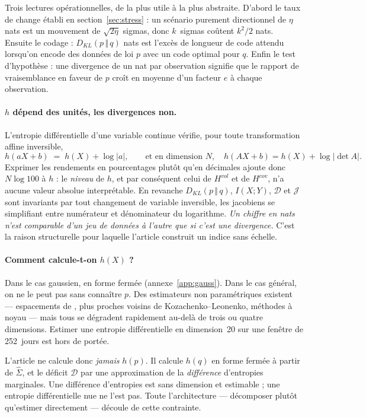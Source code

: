 \documentclass[11pt]{article}
\theoremstyle{definition}
\theoremstyle{remark}
\newcommand{\JJ}{\mathcal{J}}
\newcommand{\DD}{\mathcal{D}}
\newcommand{\KL}[2]{D_{KL}\!\left(#1\,\Vert\,#2\right)}
\begin{document}
Trois lectures opérationnelles, de la plus utile à la plus abstraite. D'abord le
taux de change établi en section~\ref{sec:stress} : un scénario purement
directionnel de $\eta$ nats est un mouvement de $\sqrt{2\eta}$ sigmas, donc
$k$~sigmas coûtent $k^2/2$ nats. Ensuite le codage : $\KL{p}{q}$ nats est
l'excès de longueur de code attendu lorsqu'on encode des données de loi $p$ avec
un code optimal pour $q$. Enfin le test d'hypothèse : une divergence de un nat
par observation signifie que le rapport de vraisemblance en faveur de $p$ croît
en moyenne d'un facteur $e$ à chaque observation.

\paragraph{$h$ dépend des unités, les divergences non.} L'entropie différentielle
d'une variable continue vérifie, pour toute transformation affine inversible,
\begin{equation}
\label{eq:h-scaling}
h(aX+b) \;=\; h(X) + \log|a| ,
\qquad\text{et en dimension } N,\quad h(AX+b)=h(X)+\log|\det A| .
\end{equation}
Exprimer les rendements en pourcentages plutôt qu'en décimales ajoute donc
$N\log 100$ à $h$ : le \emph{niveau} de $h$, et par conséquent celui de
$H^{vol}$ et de $H^{cov}$, n'a aucune valeur absolue interprétable. En revanche
$\KL{p}{q}$, $I(X;Y)$, $\DD$ et $\JJ$ sont invariants par tout changement de
variable inversible, les jacobiens se simplifiant entre numérateur et
dénominateur du logarithme. \emph{Un chiffre en nats n'est comparable d'un jeu
de données à l'autre que si c'est une divergence.} C'est la raison structurelle
pour laquelle l'article construit un indice sans échelle.

\paragraph{Comment calcule-t-on $h(X)$ ?} Dans le cas gaussien, en forme fermée
(annexe~\ref{app:gauss}). Dans le cas général, on ne le peut pas sans connaître
$p$. Des estimateurs non paramétriques existent --- espacements de
\citet{vasicek1976}, plus proches voisins de Kozachenko--Leonenko, méthodes à
noyau --- mais tous se dégradent rapidement au-delà de trois ou quatre
dimensions. Estimer une entropie différentielle en dimension~20 sur une fenêtre
de 252~jours est hors de portée.

L'article ne calcule donc \emph{jamais} $h(p)$. Il calcule $h(q)$ en forme
fermée à partir de $\widehat\Sigma$, et le déficit $\DD$ par une approximation
de la \emph{différence} d'entropies marginales. Une différence d'entropies est
sans dimension et estimable ; une entropie différentielle nue ne l'est pas.
Toute l'architecture --- décomposer plutôt qu'estimer directement --- découle de
cette contrainte.
\end{document}
